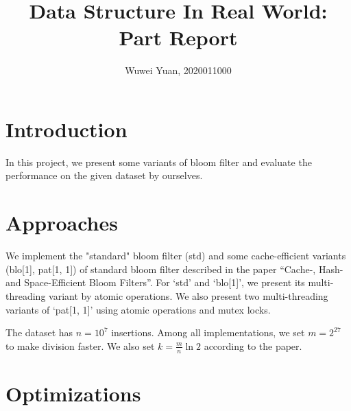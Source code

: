 \documentclass[10pt,letterpaper]{article}
\begin{document}
\title{Data Structure In Real World: Part \uppercase\expandafter{} Report}

\author{Wuwei Yuan, 2020011000\\
}

\maketitle


\section {Introduction}
	In this project, we present some variants of bloom filter and evaluate the performance on the given dataset by ourselves.
\section {Approaches}
	We implement the "standard" bloom filter (std) and some cache-efficient variants (blo[1], pat[1, 1]) of standard bloom filter described in the paper ``Cache-, Hash- and Space-Efficient Bloom Filters''. For `std' and `blo[1]', we present its multi-threading variant by atomic operations. We also present two multi-threading variants of `pat[1, 1]' using atomic operations and mutex locks.

	The dataset has $n = {10}^7$ insertions. Among all implementations, we set $m = 2^{27}$ to make division faster. We also set $k = \frac{m}{n} \ln 2$ according to the paper.
\section {Optimizations}
\end{document}
